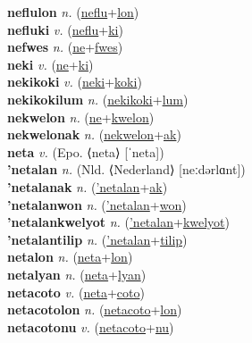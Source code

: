 \textbf{neflulon} \textit{n.} (\hyperref[neflu]{neflu}+\hyperref[lon]{lon})
 \label{neflulon} \\
\textbf{nefluki} \textit{v.} (\hyperref[neflu]{neflu}+\hyperref[ki]{ki})
 \label{nefluki} \\
\textbf{nefwes} \textit{n.} (\hyperref[ne]{ne}+\hyperref[fwes]{fwes})
 \label{nefwes} \\
\textbf{neki} \textit{v.} (\hyperref[ne]{ne}+\hyperref[ki]{ki})
 \label{neki} \\
\textbf{nekikoki} \textit{v.} (\hyperref[neki]{neki}+\hyperref[koki]{koki})
 \label{nekikoki} \\
\textbf{nekikokilum} \textit{n.} (\hyperref[nekikoki]{nekikoki}+\hyperref[lum]{lum})
 \label{nekikokilum} \\
\textbf{nekwelon} \textit{n.} (\hyperref[ne]{ne}+\hyperref[kwelon]{kwelon})
 \label{nekwelon} \\
\textbf{nekwelonak} \textit{n.} (\hyperref[nekwelon]{nekwelon}+\hyperref[ak]{ak})
 \label{nekwelonak} \\
\textbf{neta} \textit{v.} (Epo. ⟨neta⟩ [ˈneta])
 \label{neta} \\
\textbf{'netalan} \textit{n.} (Nld. ⟨Nederland⟩ [neːdərlɑnt])
 \label{'netalan} \\
\textbf{'netalanak} \textit{n.} (\hyperref['netalan]{'netalan}+\hyperref[ak]{ak})
 \label{'netalanak} \\
\textbf{'netalanwon} \textit{n.} (\hyperref['netalan]{'netalan}+\hyperref[won]{won})
 \label{'netalanwon} \\
\textbf{'netalankwelyot} \textit{n.} (\hyperref['netalan]{'netalan}+\hyperref[kwelyot]{kwelyot})
 \label{'netalankwelyot} \\
\textbf{'netalantilip} \textit{n.} (\hyperref['netalan]{'netalan}+\hyperref[tilip]{tilip})
 \label{'netalantilip} \\
\textbf{netalon} \textit{n.} (\hyperref[neta]{neta}+\hyperref[lon]{lon})
 \label{netalon} \\
\textbf{netalyan} \textit{n.} (\hyperref[neta]{neta}+\hyperref[lyan]{lyan})
 \label{netalyan} \\
\textbf{netacoto} \textit{v.} (\hyperref[neta]{neta}+\hyperref[coto]{coto})
 \label{netacoto} \\
\textbf{netacotolon} \textit{n.} (\hyperref[netacoto]{netacoto}+\hyperref[lon]{lon})
 \label{netacotolon} \\
\textbf{netacotonu} \textit{v.} (\hyperref[netacoto]{netacoto}+\hyperref[nu]{nu})
 \label{netacotonu} \\

